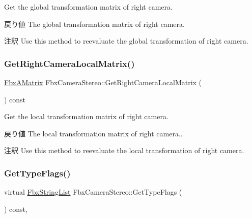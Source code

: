 Get the global transformation matrix of right camera. \begin{DoxyReturn}{戻り値}
The global transformation matrix of right camera. 
\end{DoxyReturn}
\begin{DoxyRemark}{注釈}
Use this method to reevaluate the global transformation of right camera. 
\end{DoxyRemark}
\mbox{\label{class_fbx_camera_stereo_a111785c11520b456bb43ed6701eaa84d}} 
\subsubsection{\texorpdfstring{Get\+Right\+Camera\+Local\+Matrix()}{GetRightCameraLocalMatrix()}}
{\footnotesize\ttfamily \hyperlink{class_fbx_a_matrix}{Fbx\+A\+Matrix} Fbx\+Camera\+Stereo\+::\+Get\+Right\+Camera\+Local\+Matrix (\begin{DoxyParamCaption}{ }\end{DoxyParamCaption}) const}

Get the local transformation matrix of right camera. \begin{DoxyReturn}{戻り値}
The local transformation matrix of right camera.. 
\end{DoxyReturn}
\begin{DoxyRemark}{注釈}
Use this method to reevaluate the local transformation of right camera. 
\end{DoxyRemark}
\mbox{\label{class_fbx_camera_stereo_a73c9df71edcd9a56b2710357b95fcde6}} 
\subsubsection{\texorpdfstring{Get\+Type\+Flags()}{GetTypeFlags()}}
{\footnotesize\ttfamily virtual \hyperlink{class_fbx_string_list}{Fbx\+String\+List} Fbx\+Camera\+Stereo\+::\+Get\+Type\+Flags (\begin{DoxyParamCaption}{ }\end{DoxyParamCaption}) const\hspace{0.3cm}{\ttfamily [protected]}, {\ttfamily [virtual]}}



